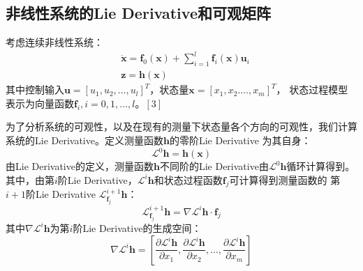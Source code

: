 \documentclass{article}
\begin{document}
\subsection{非线性系统的Lie Derivative和可观矩阵}
考虑连续非线性系统：
\begin{equation}\label{eqs:nonlinearsys1}
    \begin{aligned}
    &\dot{\textbf{x}}=\textbf{f}_0(\textbf{x})+\sum\limits_{i=1}^{l}\textbf{f}_{i}(\textbf{x})\textbf{u}_i\\
    &\textbf{z}=\textbf{h}(\textbf{x})
    \end{aligned}
\end{equation}
其中控制输入$\textbf{u}=\left[u_1,u_2,\ldots, u_l\right]^T$，状态量$\textbf{x}=\left[x_1,x_2.\ldots,x_m\right]^T$，
状态过程模型表示为向量函数$\textbf{f}_i,i=0,1,\ldots,l$。$\left[3\right]$

\par
为了分析系统的可观性，以及在现有的测量下状态量各个方向的可观性，我们计算系统的Lie Derivative。定义测量函数$\textbf{h}$的零阶Lie Derivative
为其自身：
\begin{equation}
    \mathcal{L}^0\textbf{h}=\textbf{h}(\textbf{x})
\end{equation}
由Lie Derivative的定义，测量函数$\textbf{h}$不同阶的Lie Derivative由$\mathcal{L}^0\textbf{h}$循环计算得到。
其中，由第$i$阶Lie Derivative，$\mathcal{L}^i\textbf{h}$和状态过程函数$\textbf{f}_j$可计算得到测量函数的
第$i+1$阶Lie Derivative $\mathcal{L}_{\textbf{f}_j}^{i+1}\textbf{h}$：
\begin{equation}
    \mathcal{L}_{\textbf{f}_j}^{i+1}\textbf{h}=\nabla\mathcal{L}^i\textbf{h}\cdot\textbf{f}_j
\end{equation}
其中$\nabla\mathcal{L}^i\textbf{h}$为第$i$阶Lie Derivative的生成空间：
\begin{equation}
    \nabla\mathcal{L}^i\textbf{h}=\left[\frac{\partial\mathcal{L}^i\textbf{h}}{\partial{x_1}},
    \frac{\partial\mathcal{L}^i\textbf{h}}{\partial{x_2}},\dots,
    \frac{\partial\mathcal{L}^i\textbf{h}}{\partial{x_m}}
    \right]
\end{equation}
\par
\end{document}
